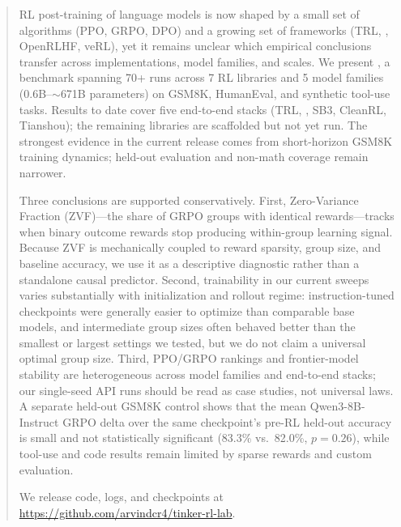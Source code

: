 \begin{abstract}
RL post-training of language models is now shaped by a small set of
algorithms (PPO, GRPO, DPO) and a growing set of frameworks (TRL,
\tinker{}, OpenRLHF, veRL), yet it remains unclear which empirical conclusions
transfer across implementations, model families, and scales. We present
\ours{}, a benchmark spanning 70+ runs across 7 RL libraries and 5 model
families (0.6B--$\sim$671B parameters) on GSM8K, HumanEval, and synthetic
tool-use tasks. Results to date cover five end-to-end stacks (TRL, \tinker{},
SB3, CleanRL, Tianshou); the remaining libraries are scaffolded but not yet run.
The strongest evidence in the current release comes
from short-horizon GSM8K training dynamics; held-out evaluation and non-math
coverage remain narrower.

Three conclusions are supported conservatively. First, Zero-Variance Fraction
(ZVF)---the share of GRPO groups with identical rewards---tracks when binary
outcome rewards stop producing within-group learning signal. Because ZVF is
mechanically coupled to reward sparsity, group size, and baseline accuracy, we
use it as a descriptive diagnostic rather than a standalone causal predictor.
Second, trainability in our current sweeps varies substantially with
initialization and rollout regime: instruction-tuned checkpoints were
generally easier to optimize than comparable base models, and intermediate
group sizes often behaved better than the smallest or largest settings we
tested, but we do not claim a universal optimal group size. Third, PPO/GRPO
rankings and frontier-model stability are heterogeneous across model families
and end-to-end stacks; our single-seed API runs should be read as case studies,
not universal laws. A separate held-out GSM8K control shows that the mean
Qwen3-8B-Instruct GRPO delta over the same checkpoint's pre-RL held-out accuracy
is small and not statistically significant (83.3\% vs.\ 82.0\%, $p{=}0.26$), while
tool-use and code results remain limited by sparse rewards and custom evaluation.

We release code, logs, and checkpoints at
\url{https://github.com/arvindcr4/tinker-rl-lab}.
\end{abstract}

